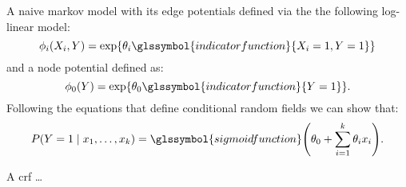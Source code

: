 {%
  A \gls{naive markov model} with its \glspl{edge potential} defined via the the following \gls{log-linear model}:
  \begin{equation*}
  \phi_i(X_i,Y)=\exp\{\theta_i\glssymbol{indicator function}\{X_i=1,Y=1\}\}
  \end{equation*}
  and a \gls{node potential} defined as:
  \begin{equation*}
    \phi_0(Y)=\exp\{\theta_0\glssymbol{indicator function}\{Y=1\}\}.
  \end{equation*}
  Following the equations that define \glspl{conditional random field} we can show that:
  \begin{equation*}
    P(Y=1\mid x_1,\dots,x_k)=\glssymbol{sigmoid function}\Bigg( \theta_0+\sum_{i=1}^k \theta_i x_i \Bigg).
  \end{equation*}
}

{%
}

{%
}

{%
  A \acrfull{crf} \dots
}

{%
}

{%
}



